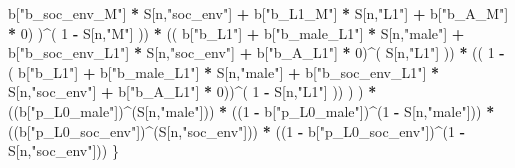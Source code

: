 \documentclass[
]{book}
\newenvironment{Shaded}{\begin{snugshade}}{\end{snugshade}}
\newcommand{\DecValTok}[1]{\textcolor[rgb]{0.00,0.00,0.81}{#1}}
\newcommand{\NormalTok}[1]{#1}
\newcommand{\SpecialCharTok}[1]{\textcolor[rgb]{0.81,0.36,0.00}{\textbf{#1}}}
\newcommand{\StringTok}[1]{\textcolor[rgb]{0.31,0.60,0.02}{#1}}
\begin{document}
\begin{Shaded}
\begin{Highlighting}[]
\NormalTok{                                  b[}\StringTok{"b\_soc\_env\_M"}\NormalTok{] }\SpecialCharTok{*}\NormalTok{ S[n,}\StringTok{"soc\_env"}\NormalTok{] }\SpecialCharTok{+} 
\NormalTok{                                  b[}\StringTok{"b\_L1\_M"}\NormalTok{] }\SpecialCharTok{*}\NormalTok{ S[n,}\StringTok{"L1"}\NormalTok{] }\SpecialCharTok{+}
\NormalTok{                                  b[}\StringTok{"b\_A\_M"}\NormalTok{] }\SpecialCharTok{*} \DecValTok{0}\NormalTok{) )}\SpecialCharTok{\^{}}\NormalTok{( }\DecValTok{1} \SpecialCharTok{{-}}\NormalTok{ S[n,}\StringTok{"M"}\NormalTok{] )) }\SpecialCharTok{*}
\NormalTok{                        (( b[}\StringTok{"b\_L1"}\NormalTok{] }\SpecialCharTok{+}
\NormalTok{                             b[}\StringTok{"b\_male\_L1"}\NormalTok{] }\SpecialCharTok{*}\NormalTok{ S[n,}\StringTok{"male"}\NormalTok{] }\SpecialCharTok{+}  
\NormalTok{                             b[}\StringTok{"b\_soc\_env\_L1"}\NormalTok{] }\SpecialCharTok{*}\NormalTok{ S[n,}\StringTok{"soc\_env"}\NormalTok{] }\SpecialCharTok{+}
\NormalTok{                             b[}\StringTok{"b\_A\_L1"}\NormalTok{] }\SpecialCharTok{*} \DecValTok{0}\NormalTok{)}\SpecialCharTok{\^{}}\NormalTok{( S[n,}\StringTok{"L1"}\NormalTok{] )) }\SpecialCharTok{*}
\NormalTok{                        (( }\DecValTok{1} \SpecialCharTok{{-}}\NormalTok{ ( b[}\StringTok{"b\_L1"}\NormalTok{] }\SpecialCharTok{+}
\NormalTok{                                   b[}\StringTok{"b\_male\_L1"}\NormalTok{] }\SpecialCharTok{*}\NormalTok{ S[n,}\StringTok{"male"}\NormalTok{] }\SpecialCharTok{+}  
\NormalTok{                                   b[}\StringTok{"b\_soc\_env\_L1"}\NormalTok{] }\SpecialCharTok{*}\NormalTok{ S[n,}\StringTok{"soc\_env"}\NormalTok{] }\SpecialCharTok{+}
\NormalTok{                                   b[}\StringTok{"b\_A\_L1"}\NormalTok{] }\SpecialCharTok{*} \DecValTok{0}\NormalTok{))}\SpecialCharTok{\^{}}\NormalTok{( }\DecValTok{1} \SpecialCharTok{{-}}\NormalTok{ S[n,}\StringTok{"L1"}\NormalTok{] )) ) ) }\SpecialCharTok{*}
\NormalTok{      ((b[}\StringTok{"p\_L0\_male"}\NormalTok{])}\SpecialCharTok{\^{}}\NormalTok{(S[n,}\StringTok{"male"}\NormalTok{])) }\SpecialCharTok{*} 
\NormalTok{      ((}\DecValTok{1} \SpecialCharTok{{-}}\NormalTok{ b[}\StringTok{"p\_L0\_male"}\NormalTok{])}\SpecialCharTok{\^{}}\NormalTok{(}\DecValTok{1} \SpecialCharTok{{-}}\NormalTok{ S[n,}\StringTok{"male"}\NormalTok{])) }\SpecialCharTok{*} 
\NormalTok{      ((b[}\StringTok{"p\_L0\_soc\_env"}\NormalTok{])}\SpecialCharTok{\^{}}\NormalTok{(S[n,}\StringTok{"soc\_env"}\NormalTok{])) }\SpecialCharTok{*}
\NormalTok{      ((}\DecValTok{1} \SpecialCharTok{{-}}\NormalTok{ b[}\StringTok{"p\_L0\_soc\_env"}\NormalTok{])}\SpecialCharTok{\^{}}\NormalTok{(}\DecValTok{1} \SpecialCharTok{{-}}\NormalTok{ S[n,}\StringTok{"soc\_env"}\NormalTok{])) }
\NormalTok{    \}}
  

\end{Highlighting}
\end{Shaded}
\end{document}
